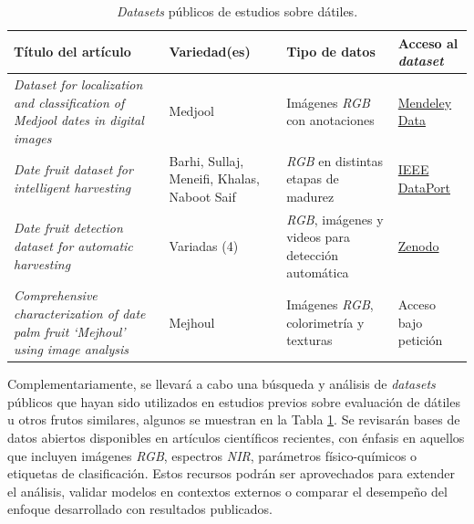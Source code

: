 \begin{table}[h]
\footnotesize
\centering
\begin{tabular}{|p{5cm}|p{2.5cm}|p{3cm}|p{2.5cm}|}
\hline
\textbf{Título del artículo} & \textbf{Variedad(es)} & \textbf{Tipo de datos} & \textbf{Acceso al \textit{dataset}} \\
\hline

\textit{Dataset for localization and classification of Medjool dates in digital images} \newline \parencite{perez-perez_dataset_2021} & Medjool & Imágenes \textit{RGB} con anotaciones & \href{https://data.mendeley.com/datasets/872xk9npmz/1}{Mendeley Data} \\

\hline

\textit{Date fruit dataset for intelligent harvesting} \newline \parencite{altaheri_date_2019} & Barhi, Sullaj, Meneifi, Khalas, Naboot Saif & \textit{RGB} en distintas etapas de madurez & \href{https://ieee-dataport.org/open-access/date-fruit-dataset-automated-harvesting-and-visual-yield-estimation}{IEEE DataPort} \\

\hline

\textit{Date fruit detection dataset for automatic harvesting} \newline \parencite{zarouit_date_2024} & Variadas (4) & \textit{RGB}, imágenes y videos para detección automática & \href{https://zenodo.org/records/10143465}{Zenodo} \\

\hline

\textit{Comprehensive characterization of date palm fruit ‘Mejhoul’ using image analysis} \newline \parencite{noutfia_comprehensive_2022} & Mejhoul & Imágenes \textit{RGB}, colorimetría y texturas & Acceso bajo petición \\

\hline

\end{tabular}
\caption{\textit{Datasets} públicos de estudios sobre dátiles.}
\label{tab:datasets}
\end{table}

Complementariamente, se llevará a cabo una búsqueda y análisis de \textit{datasets} públicos que hayan sido utilizados en estudios previos sobre evaluación de dátiles u otros frutos similares, algunos se muestran en la Tabla \ref{tab:datasets}. Se revisarán bases de datos abiertos disponibles en artículos científicos recientes, con énfasis en aquellos que incluyen imágenes \textit{RGB}, espectros \textit{NIR}, parámetros físico-químicos o etiquetas de clasificación. Estos recursos podrán ser aprovechados para extender el análisis, validar modelos en contextos externos o comparar el desempeño del enfoque desarrollado con resultados publicados.\\

